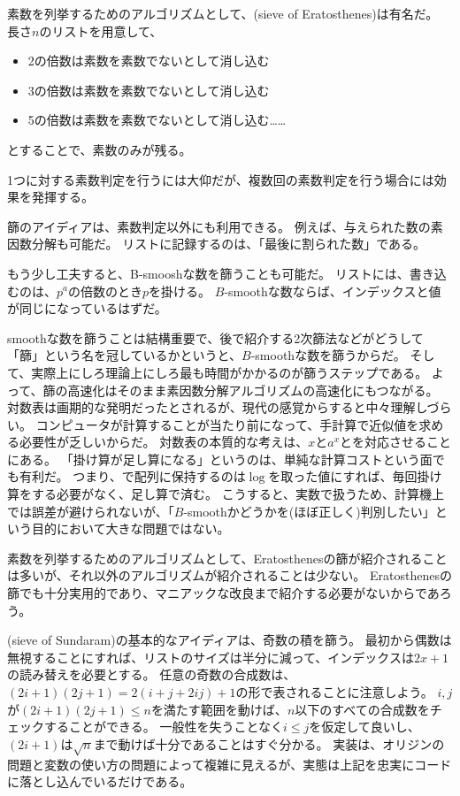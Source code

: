 素数を列挙するためのアルゴリズムとして、(sieve of Eratosthenes)は有名だ。
長さ$n$のリストを用意して、
\begin{itemize}
 \item 2の倍数は素数を素数でないとして消し込む
 \item 3の倍数は素数を素数でないとして消し込む
 \item 5の倍数は素数を素数でないとして消し込む……
\end{itemize}
とすることで、素数のみが残る。


1つに対する素数判定を行うには大仰だが、複数回の素数判定を行う場合には効果を発揮する。

篩のアイディアは、素数判定以外にも利用できる。
例えば、与えられた数の素因数分解も可能だ。
リストに記録するのは、「最後に割られた数」である。


もう少し工夫すると、B-smooshな数を篩うことも可能だ。
リストには、書き込むのは、$p^a$の倍数のとき$p$を掛ける。
$B$-smoothな数ならば、インデックスと値が同じになっているはずだ。


smoothな数を篩うことは結構重要で、後で紹介する2次篩法などがどうして「篩」という名を冠しているかというと、$B$-smoothな数を篩うからだ。
そして、実際上にしろ理論上にしろ最も時間がかかるのが篩うステップである。
よって、篩の高速化はそのまま素因数分解アルゴリズムの高速化にもつながる。
対数表は画期的な発明だったとされるが、現代の感覚からすると中々理解しづらい。
コンピュータが計算することが当たり前になって、手計算で近似値を求める必要性が乏しいからだ。
対数表の本質的な考えは、$x$と$a^x$とを対応させることにある。
「掛け算が足し算になる」というのは、単純な計算コストという面でも有利だ。
つまり、で配列に保持するのは$\log$を取った値にすれば、毎回掛け算をする必要がなく、足し算で済む。
こうすると、実数で扱うため、計算機上では誤差が避けられないが、「$B$-smoothかどうかを(ほぼ正しく)判別したい」という目的において大きな問題ではない。

素数を列挙するためのアルゴリズムとして、Eratosthenesの篩が紹介されることは多いが、それ以外のアルゴリズムが紹介されることは少ない。
Eratosthenesの篩でも十分実用的であり、マニアックな改良まで紹介する必要がないからであろう。

(sieve of Sundaram)の基本的なアイディアは、奇数の積を篩う。
最初から偶数は無視することにすれば、リストのサイズは半分に減って、インデックスは$2x+1$の読み替えを必要とする。
任意の奇数の合成数は、$(2i+1)(2j+1)=2(i+j+2ij)+1$の形で表されることに注意しよう。
$i,j$が$(2i+1)(2j+1)\le n$を満たす範囲を動けば、$n$以下のすべての合成数をチェックすることができる。
一般性を失うことなく$i\le j$を仮定して良いし、$(2i+1)$は$\sqrt{n}$まで動けば十分であることはすぐ分かる。
実装は、オリジンの問題と変数の使い方の問題によって複雑に見えるが、実態は上記を忠実にコードに落とし込んでいるだけである。

